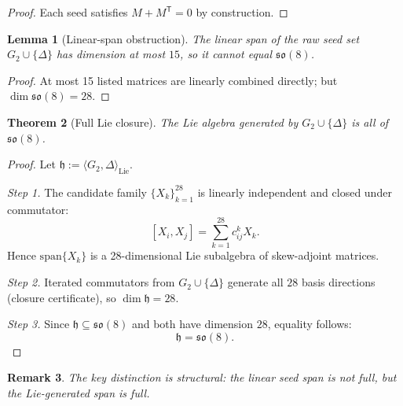 \documentclass[11pt]{amsart}
\newtheorem{theorem}{Theorem}[section]
\newtheorem{lemma}[theorem]{Lemma}
\newtheorem{remark}[theorem]{Remark}
\begin{document}
\begin{proof}
Each seed satisfies $M+M^{\mathsf T}=0$ by construction.
\end{proof}

\begin{lemma}[Linear-span obstruction]
The linear span of the raw seed set $G_2\cup\{\Delta\}$ has dimension at most $15$, so it cannot equal $\mathfrak{so}(8)$.
\end{lemma}

\begin{proof}
At most 15 listed matrices are linearly combined directly; but $\dim\mathfrak{so}(8)=28$.
\end{proof}

\begin{theorem}[Full Lie closure]
\label{thm:full-lie-closure}
The Lie algebra generated by $G_2\cup\{\Delta\}$ is all of $\mathfrak{so}(8)$.
\end{theorem}

\begin{proof}
Let $\mathfrak h:=\langle G_2,\Delta\rangle_{\mathrm{Lie}}$.

\emph{Step 1.} The candidate family $\{X_k\}_{k=1}^{28}$ is linearly independent and closed under commutator:
\[
[X_i,X_j]=\sum_{k=1}^{28} c_{ij}^k X_k.
\]
Hence $\mathrm{span}\{X_k\}$ is a 28-dimensional Lie subalgebra of skew-adjoint matrices.

\emph{Step 2.} Iterated commutators from $G_2\cup\{\Delta\}$ generate all $28$ basis directions (closure certificate), so $\dim\mathfrak h=28$.

\emph{Step 3.} Since $\mathfrak h\subseteq\mathfrak{so}(8)$ and both have dimension $28$, equality follows:
\[
\mathfrak h=\mathfrak{so}(8).
\]
\end{proof}

\begin{remark}
The key distinction is structural: the \emph{linear} seed span is not full, but the \emph{Lie-generated} span is full.
\end{remark}
\end{document}
